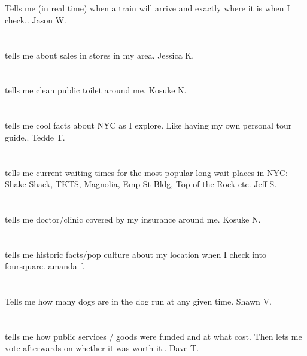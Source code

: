 \section{}Tells me (in real time) when a train will arrive and exactly where it is when I check.. Jason W.
\section{}tells me about sales in stores in my area. Jessica K.
\section{}tells me clean public toilet around me. Kosuke N.
\section{}tells me cool facts about NYC as I explore. Like having my own personal tour guide.. Tedde T.
\section{}tells me current waiting times for the most popular long-wait places in NYC: Shake Shack,  TKTS,  Magnolia,   Emp St Bldg,  Top of the Rock etc. Jeff S.
\section{}tells me doctor/clinic covered by my insurance around me. Kosuke N.
\section{} tells me historic facts/pop culture about my location when I check into foursquare. amanda f.
\section{}Tells me how many dogs are in the dog run at any given time. Shawn V.
\section{} tells me how public services / goods were funded and at what cost. Then lets me vote afterwards on whether it was worth it.. Dave T.

